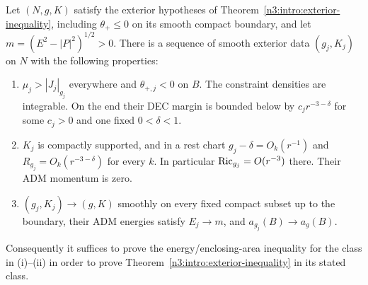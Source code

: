 \begin{proposition}
\label{n3:reduction:rest-reduction}
Let $(N,g,K)$ satisfy the exterior hypotheses of
Theorem~\ref{n3:intro:exterior-inequality}, including $\theta_+\le0$ on its
smooth compact boundary, and let $m=(E^2-|P|^2)^{1/2}>0$.
There is a sequence of smooth exterior data $(g_j,K_j)$ on $N$ with the
following properties:
\begin{enumerate}[label=\textup{(\roman*)}]
\item $\mu_j>|J_j|_{g_j}$ everywhere and $\theta_{+,j}<0$ on $B$.
      The constraint densities are integrable.  On the end their DEC
      margin is bounded below by $c_jr^{-3-\delta}$ for some $c_j>0$
      and one fixed $0<\delta<1$.
\item $K_j$ is compactly supported, and in a rest chart
      $g_j-\delta=O_k(r^{-1})$ and $R_{g_j}=O_k(r^{-3-\delta})$
      for every $k$.  In particular
      $\operatorname{Ric}_{g_j}=O(r^{-3})$ there.  Their ADM momentum is zero.
\item $(g_j,K_j)\to(g,K)$ smoothly on every fixed compact subset up to
      the boundary, their ADM energies satisfy $E_j\to m$, and
      $a_{g_j}(B)\to a_g(B)$.
\end{enumerate}
Consequently it suffices to prove the energy/enclosing-area inequality
for the class in \textup{(i)}--\textup{(ii)} in order to prove
Theorem~\ref{n3:intro:exterior-inequality} in its stated class.
\end{proposition}

